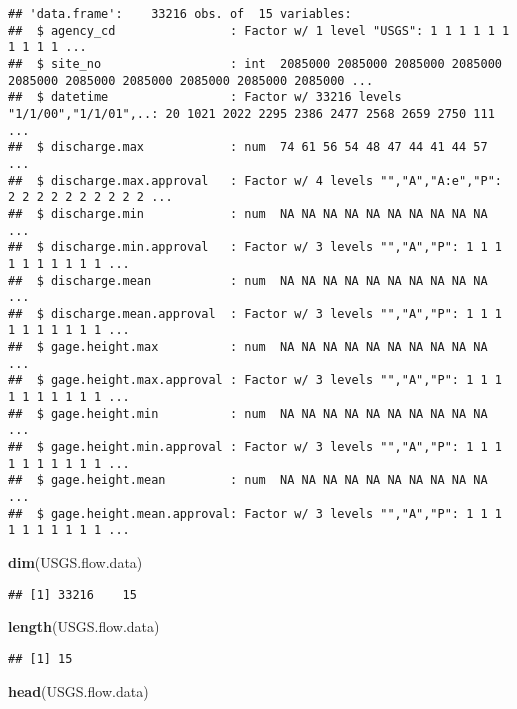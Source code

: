 \documentclass[]{article}
\newenvironment{Shaded}{\begin{snugshade}}{\end{snugshade}}
\newcommand{\KeywordTok}[1]{\textcolor[rgb]{0.13,0.29,0.53}{\textbf{#1}}}
\newcommand{\NormalTok}[1]{#1}
\begin{document}
\begin{verbatim}
## 'data.frame':    33216 obs. of  15 variables:
##  $ agency_cd                : Factor w/ 1 level "USGS": 1 1 1 1 1 1 1 1 1 1 ...
##  $ site_no                  : int  2085000 2085000 2085000 2085000 2085000 2085000 2085000 2085000 2085000 2085000 ...
##  $ datetime                 : Factor w/ 33216 levels "1/1/00","1/1/01",..: 20 1021 2022 2295 2386 2477 2568 2659 2750 111 ...
##  $ discharge.max            : num  74 61 56 54 48 47 44 41 44 57 ...
##  $ discharge.max.approval   : Factor w/ 4 levels "","A","A:e","P": 2 2 2 2 2 2 2 2 2 2 ...
##  $ discharge.min            : num  NA NA NA NA NA NA NA NA NA NA ...
##  $ discharge.min.approval   : Factor w/ 3 levels "","A","P": 1 1 1 1 1 1 1 1 1 1 ...
##  $ discharge.mean           : num  NA NA NA NA NA NA NA NA NA NA ...
##  $ discharge.mean.approval  : Factor w/ 3 levels "","A","P": 1 1 1 1 1 1 1 1 1 1 ...
##  $ gage.height.max          : num  NA NA NA NA NA NA NA NA NA NA ...
##  $ gage.height.max.approval : Factor w/ 3 levels "","A","P": 1 1 1 1 1 1 1 1 1 1 ...
##  $ gage.height.min          : num  NA NA NA NA NA NA NA NA NA NA ...
##  $ gage.height.min.approval : Factor w/ 3 levels "","A","P": 1 1 1 1 1 1 1 1 1 1 ...
##  $ gage.height.mean         : num  NA NA NA NA NA NA NA NA NA NA ...
##  $ gage.height.mean.approval: Factor w/ 3 levels "","A","P": 1 1 1 1 1 1 1 1 1 1 ...
\end{verbatim}

\begin{Shaded}
\begin{Highlighting}[]
\KeywordTok{dim}\NormalTok{(USGS.flow.data)}
\end{Highlighting}
\end{Shaded}

\begin{verbatim}
## [1] 33216    15
\end{verbatim}

\begin{Shaded}
\begin{Highlighting}[]
\KeywordTok{length}\NormalTok{(USGS.flow.data)}
\end{Highlighting}
\end{Shaded}

\begin{verbatim}
## [1] 15
\end{verbatim}

\begin{Shaded}
\begin{Highlighting}[]
\KeywordTok{head}\NormalTok{(USGS.flow.data)}
\end{Highlighting}
\end{Shaded}
\end{document}
